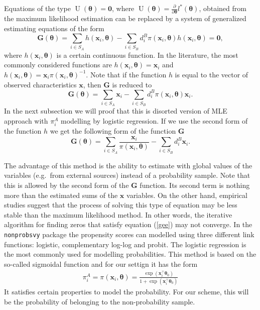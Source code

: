 \documentclass[
]{jss}
\begin{document}
Equations of the type
\(\operatorname{U}(\boldsymbol{\theta}) = \boldsymbol{0}\), where
\(\operatorname{U}(\boldsymbol{\theta}) = \frac{\partial}{\partial \boldsymbol{\theta}} l^*(\boldsymbol{\theta})\),
obtained from the maximum likelihood estimation can be replaced by a
system of generalized estimating equations of the form \begin{equation}
\label{gee}
\mathbf{G}(\boldsymbol{\theta})=\sum_{i \in S_A} h\left(\boldsymbol{x}_i, \boldsymbol{\theta}\right)-\sum_{i \in S_B} d_i^B \pi\left(\boldsymbol{x}_i, \boldsymbol{\theta}\right) h\left(\boldsymbol{x}_i, \boldsymbol{\theta}\right) = \boldsymbol{0},
\end{equation} where
\(h\left(\boldsymbol{x}_i, \boldsymbol{\theta}\right)\) is a certain
continuous function. In the literature, the most commonly considered
functions are
\(h\left(\boldsymbol{x}_i, \boldsymbol{\theta}\right) = \boldsymbol{x}_i\)
and
\(h\left(\boldsymbol{x}_i, \boldsymbol{\theta}\right) = \boldsymbol{x}_i \pi\left(\boldsymbol{x}_i, \boldsymbol{\theta}\right)^{-1}\).
Note that if the function \(h\) is equal to the vector of observed
characteristics \(\boldsymbol{x}\), then \(\mathbf{G}\) is reduced to \[
\mathbf{G}(\boldsymbol{\theta}) = \sum_{i \in S_A} \boldsymbol{x}_i-\sum_{i \in S_B} d_i^B \pi\left(\boldsymbol{x}_i, \boldsymbol{\theta}\right) \boldsymbol{x}_i.
\] In the next subsection we will proof that this is disorted version of
MLE approach with \(\pi_i^A\) modelling by logistic regression. If we
use the second form of the function \(h\) we get the following form of
the function \(\mathbf{G}\) \[
\mathbf{G}(\boldsymbol{\theta}) = \sum_{i \in S_A} \frac{\boldsymbol{x}_i}{\pi\left(\boldsymbol{x}_i, \boldsymbol{\theta}\right) }-\sum_{i \in S_B} d_i^B \boldsymbol{x}_i.
\]

The advantage of this method is the ability to estimate with global
values of the variables (e.g.~from external sources) instead of a
probability sample. Note that this is allowed by the second form of the
\(\mathbf{G}\) function. Its second term is nothing more than the
estimated sums of the \(\boldsymbol{x}\) variables. On the other hand,
empirical studies suggest that the process of solving this type of
equation may be less stable than the maximum likelihood method. In other
words, the iterative algorithm for finding zeros that satisfy equation
(\ref{gee}) may not converge. In the \texttt{nonprobsvy} package the
propensity scores can modelled using three different link functions:
logistic, complementary log-log and probit. The logistic regression is
the most commonly used for modelling probabilities. This method is based
on the so-called sigmoidal function and for our settign it has the form
\begin{align}
\label{logit-fun}
    \pi_{i}^{A} = \pi(\boldsymbol{x}_{i}, \boldsymbol{\theta}) = \frac{\exp\left(\boldsymbol{x}_{i}^{\top}\boldsymbol{\theta}_{0}\right)}{ 1 + \exp\left(\boldsymbol{x}_{i}^{\top}\boldsymbol{\theta}_{0}\right)}
\end{align} It satisfies certain properties to model the probability.
For our scheme, this will be the probability of belonging to the
non-probability sample.
\end{document}
